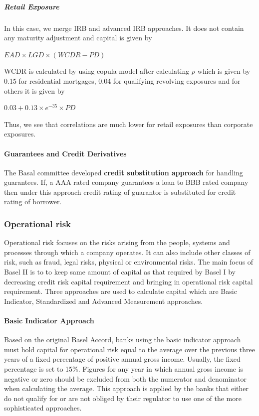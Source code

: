 \documentclass[11pt]{article}
\numberwithin{equation}{section}
\begin{document}
\subparagraph{Retail Exposure}\mbox{}
\medskip

\hspace{1cm}In this case, we merge IRB and advanced IRB approaches. It does not contain any maturity adjustment and capital is given by
\begin{center}
$EAD \times LGD \times (WCDR-PD)$
\end{center}
WCDR is calculated by using copula model after calculating $\rho$ which is given by 0.15 for residential mortgages, 0.04 for qualifying revolving exposures and for others it is given by 
\begin{center}
 $0.03+0.13\times e^{-35}\times PD$
\end{center}
Thus, we see that correlations are much lower for retail exposures than corporate exposures. 

\paragraph{Guarantees and Credit Derivatives}\mbox{}
\medskip

The Basal committee developed \textbf{credit substitution approach} for handling guarantees. If, a AAA rated company guarantees a loan to BBB rated company then under this approach credit rating of guarantor is substituted for credit rating of borrower. 

\subsubsection{Operational risk}
\medskip

Operational risk focuses on the risks arising from the people, systems and processes through which a company operates. It can also include other classes of risk, such as fraud, legal risks, physical or environmental risks. The main focus of Basel II is to to keep same amount of capital as that required by Basel I by decreasing credit risk capital requirement and bringing in operational risk capital requirement. Three approaches are used to calculate capital which are Basic Indicator, Standardized and Advanced Measurement approaches.
\paragraph{Basic Indicator Approach}\mbox{} 
\medskip

Based on the original Basel Accord, banks using the basic indicator approach must hold capital for operational risk equal to the average over the previous three years of a fixed percentage of positive annual gross income. Usually, the fixed percentage is set to 15\%. Figures for any year in which annual gross income is negative or zero should be excluded from both the numerator and denominator when calculating the average. This approach is applied by the banks that either do not qualify for or are not obliged by their regulator to use one of the more sophisticated approaches. 
\end{document}
